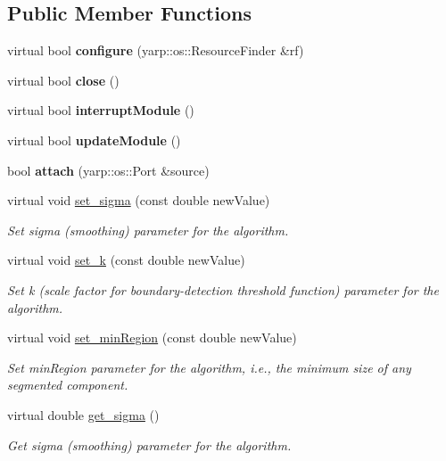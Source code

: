 \subsection*{Public Member Functions}
\begin{DoxyCompactItemize}
\item 
\mbox{\label{classGBSegmModule_ada22cbfc66dd9b75a7a824e1ce642639}} 
virtual bool {\bfseries configure} (yarp\+::os\+::\+Resource\+Finder \&rf)
\item 
\mbox{\label{classGBSegmModule_ac3259b29883674bf47aa962f54806913}} 
virtual bool {\bfseries close} ()
\item 
\mbox{\label{classGBSegmModule_a99b9908ade3135dd5ee491b799d5e171}} 
virtual bool {\bfseries interrupt\+Module} ()
\item 
\mbox{\label{classGBSegmModule_a66f40b6ae480a039a2c10f6b91c59dde}} 
virtual bool {\bfseries update\+Module} ()
\item 
\mbox{\label{classGBSegmModule_a4ae8d5fee391d799299a10e09a5ea8c4}} 
bool {\bfseries attach} (yarp\+::os\+::\+Port \&source)
\item 
virtual void \mbox{\hyperlink{classGBSegmModule_a27ffe08d394d321d9f9441423d36ef5e}{set\+\_\+sigma}} (const double new\+Value)
\begin{DoxyCompactList}\small\item\em Set sigma (smoothing) parameter for the algorithm. \end{DoxyCompactList}\item 
virtual void \mbox{\hyperlink{classGBSegmModule_a15129913273e221a46c428f697e40575}{set\+\_\+k}} (const double new\+Value)
\begin{DoxyCompactList}\small\item\em Set k (scale factor for boundary-\/detection threshold function) parameter for the algorithm. \end{DoxyCompactList}\item 
virtual void \mbox{\hyperlink{classGBSegmModule_ae1c722c9c774cbde4f6bfada3f0826ba}{set\+\_\+min\+Region}} (const double new\+Value)
\begin{DoxyCompactList}\small\item\em Set min\+Region parameter for the algorithm, i.\+e., the minimum size of any segmented component. \end{DoxyCompactList}\item 
virtual double \mbox{\hyperlink{classGBSegmModule_ae32ae1b1461e19c3a1b2f429c729ed03}{get\+\_\+sigma}} ()
\begin{DoxyCompactList}\small\item\em Get sigma (smoothing) parameter for the algorithm. \end{DoxyCompactList}\item 

\end{DoxyCompactItemize}
